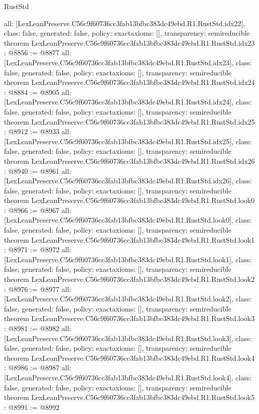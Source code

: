 \begin{lexlean}{RustStd}
\begin{coremodule}
{  all: [LexLeanPreserve.C56c9f60736cc3fab13bfbc383dc49ebd.R1.RustStd.idx22],
  class: false,
  generated: false,
  policy: exact{axioms: []},
  transparency: semireducible
}
theorem LexLeanPreserve.C56c9f60736cc3fab13bfbc383dc49ebd.R1.RustStd.idx23 : @8856 := @8877 {
  all: [LexLeanPreserve.C56c9f60736cc3fab13bfbc383dc49ebd.R1.RustStd.idx23],
  class: false,
  generated: false,
  policy: exact{axioms: []},
  transparency: semireducible
}
theorem LexLeanPreserve.C56c9f60736cc3fab13bfbc383dc49ebd.R1.RustStd.idx24 : @8884 := @8905 {
  all: [LexLeanPreserve.C56c9f60736cc3fab13bfbc383dc49ebd.R1.RustStd.idx24],
  class: false,
  generated: false,
  policy: exact{axioms: []},
  transparency: semireducible
}
theorem LexLeanPreserve.C56c9f60736cc3fab13bfbc383dc49ebd.R1.RustStd.idx25 : @8912 := @8933 {
  all: [LexLeanPreserve.C56c9f60736cc3fab13bfbc383dc49ebd.R1.RustStd.idx25],
  class: false,
  generated: false,
  policy: exact{axioms: []},
  transparency: semireducible
}
theorem LexLeanPreserve.C56c9f60736cc3fab13bfbc383dc49ebd.R1.RustStd.idx26 : @8940 := @8961 {
  all: [LexLeanPreserve.C56c9f60736cc3fab13bfbc383dc49ebd.R1.RustStd.idx26],
  class: false,
  generated: false,
  policy: exact{axioms: []},
  transparency: semireducible
}
theorem LexLeanPreserve.C56c9f60736cc3fab13bfbc383dc49ebd.R1.RustStd.look0 : @8966 := @8967 {
  all: [LexLeanPreserve.C56c9f60736cc3fab13bfbc383dc49ebd.R1.RustStd.look0],
  class: false,
  generated: false,
  policy: exact{axioms: []},
  transparency: semireducible
}
theorem LexLeanPreserve.C56c9f60736cc3fab13bfbc383dc49ebd.R1.RustStd.look1 : @8971 := @8972 {
  all: [LexLeanPreserve.C56c9f60736cc3fab13bfbc383dc49ebd.R1.RustStd.look1],
  class: false,
  generated: false,
  policy: exact{axioms: []},
  transparency: semireducible
}
theorem LexLeanPreserve.C56c9f60736cc3fab13bfbc383dc49ebd.R1.RustStd.look2 : @8976 := @8977 {
  all: [LexLeanPreserve.C56c9f60736cc3fab13bfbc383dc49ebd.R1.RustStd.look2],
  class: false,
  generated: false,
  policy: exact{axioms: []},
  transparency: semireducible
}
theorem LexLeanPreserve.C56c9f60736cc3fab13bfbc383dc49ebd.R1.RustStd.look3 : @8981 := @8982 {
  all: [LexLeanPreserve.C56c9f60736cc3fab13bfbc383dc49ebd.R1.RustStd.look3],
  class: false,
  generated: false,
  policy: exact{axioms: []},
  transparency: semireducible
}
theorem LexLeanPreserve.C56c9f60736cc3fab13bfbc383dc49ebd.R1.RustStd.look4 : @8986 := @8987 {
  all: [LexLeanPreserve.C56c9f60736cc3fab13bfbc383dc49ebd.R1.RustStd.look4],
  class: false,
  generated: false,
  policy: exact{axioms: []},
  transparency: semireducible
}
theorem LexLeanPreserve.C56c9f60736cc3fab13bfbc383dc49ebd.R1.RustStd.look5 : @8991 := @8992 {
}
\end{coremodule}
\end{lexlean}
